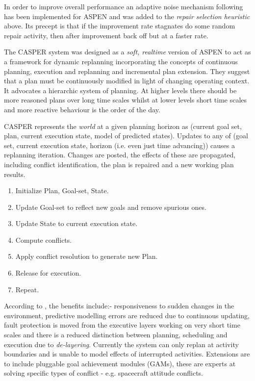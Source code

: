 In order to improve overall performance an adaptive noise mechanism following \citet{hoos02adaptive} has been implemented for ASPEN \citep{fukunaga04robust} and was added to the \emph{repair selection heuristic} above. Its precept is that if the improvement rate stagnates do some random repair activity, then after improvement back off but at a faster rate.%

The CASPER system \citep{chien99iterative, chien00aspen} was designed as a \emph{soft, realtime} version of ASPEN to act as a framework for dynamic replanning incorporating the concepts of continuous planning, execution and replanning and incremental plan extension. They suggest that a plan must be continuously modified in light of changing operating context. It advocates a hierarchic system of planning. At higher levels there should be more reasoned plans over long time scales whilst at lower levels short time scales and more reactive behaviour is the order of the day. %

CASPER represents the \emph{world} at a given planning horizon as (current goal set, plan, current execution state, model of predicted states). Updates to any of (goal set, current execution state, horizon (i.e. even just time advancing)) causes a replanning iteration. Changes are posted, the effects of these are propagated, including conflict identification, the plan is repaired and a new working plan results.

\begin{enumerate}
\item Initialize Plan, Goal-set, State.
\item Update Goal-set to reflect new goals and remove spurious ones.
\item Update State to current execution state.
\item Compute conflicts.
\item Apply conflict resolution to generate new Plan.
\item Release for execution.
\item Repeat.
\end{enumerate}

According to \citet{chien98integrated}, the benefits include:- responsiveness to sudden changes in the environment, predictive modelling errors are reduced due to continuous updating, fault protection is moved from the executive layers working on very short time scales and there is a reduced distinction between planning, scheduling and execution due to \emph{de-layering}. Currently the system can only replan at activity boundaries and is unable to model effects of interrupted activities. Extensions are to include pluggable goal achievement modules (GAMs), these are experts at solving specific types of conflict - e.g. spacecraft attitude conflicts.

